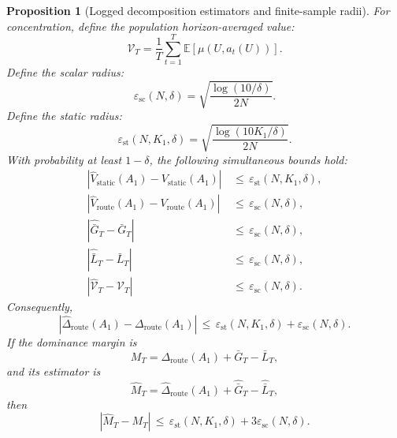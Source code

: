 \documentclass{article} %
\newtheorem{proposition}[theorem]{Proposition}
\begin{document}
\begin{proposition}[Logged decomposition estimators and finite-sample radii]
For concentration, define the population horizon-averaged value:
\begin{equation}
\label{eq:app-six-pop-value}
\mathcal{V}_T
=
\frac{1}{T}\sum_{t=1}^{T}\mathbb{E}[\mu(U,a_t(U))].
\end{equation}
Define the scalar radius:
\begin{equation}
\label{eq:app-six-scalar-radius}
\varepsilon_{\mathrm{sc}}(N,\delta)
=
\sqrt{\frac{\log(10/\delta)}{2N}}.
\end{equation}
Define the static radius:
\begin{equation}
\label{eq:app-six-static-radius}
\varepsilon_{\mathrm{st}}(N,K_1,\delta)
=
\sqrt{\frac{\log(10K_1/\delta)}{2N}}.
\end{equation}
With probability at least \(1-\delta\), the following simultaneous bounds hold:
\begin{align}
\label{eq:app-six-estimator-bounds}
\left|
\widehat V_{\mathrm{static}}(A_1)-V_{\mathrm{static}}(A_1)
\right|
&\,\le\,
\varepsilon_{\mathrm{st}}(N,K_1,\delta),
\\
\left|
\widehat V_{\mathrm{route}}(A_1)-V_{\mathrm{route}}(A_1)
\right|
&\,\le\,
\varepsilon_{\mathrm{sc}}(N,\delta),
\\
\left|
\widehat{\bar G}_T-\bar G_T
\right|
&\,\le\,
\varepsilon_{\mathrm{sc}}(N,\delta),
\\
\left|
\widehat{\bar L}_T-\bar L_T
\right|
&\,\le\,
\varepsilon_{\mathrm{sc}}(N,\delta),
\\
\left|
\widehat{\mathcal{V}}_T-\mathcal{V}_T
\right|
&\,\le\,
\varepsilon_{\mathrm{sc}}(N,\delta).
\end{align}
Consequently,
\begin{equation}
\label{eq:app-six-delta-radius}
\left|
\widehat\Delta_{\mathrm{route}}(A_1)-\Delta_{\mathrm{route}}(A_1)
\right|
\,\le\,
\varepsilon_{\mathrm{st}}(N,K_1,\delta)
+
\varepsilon_{\mathrm{sc}}(N,\delta).
\end{equation}
If the dominance margin is
\begin{equation}
\label{eq:app-six-margin-pop}
M_T
=
\Delta_{\mathrm{route}}(A_1)+\bar G_T-\bar L_T,
\end{equation}
and its estimator is
\begin{equation}
\label{eq:app-six-margin-hat}
\widehat M_T
=
\widehat\Delta_{\mathrm{route}}(A_1)
+
\widehat{\bar G}_T
-
\widehat{\bar L}_T,
\end{equation}
then
\begin{equation}
\label{eq:app-six-margin-radius}
|\widehat M_T-M_T|
\,\le\,
\varepsilon_{\mathrm{st}}(N,K_1,\delta)
+
3\varepsilon_{\mathrm{sc}}(N,\delta).
\end{equation}
\end{proposition}
\end{document}
